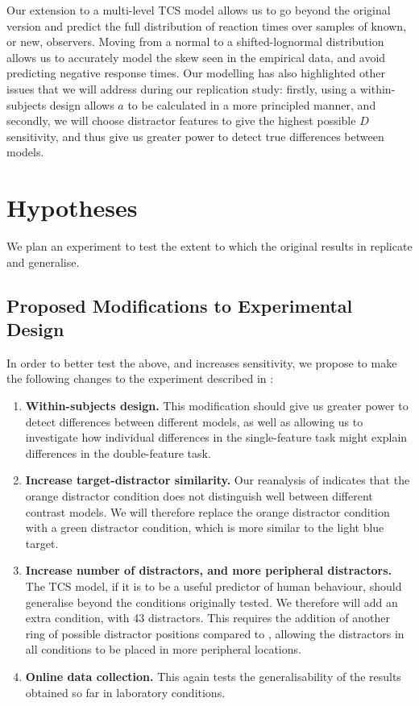 \documentclass[preprint,12pt,authoryear]{elsarticle}
\begin{document}
Our extension to a multi-level TCS model allows us to go beyond the original version and predict the full distribution of reaction times over samples of known, or new, observers. Moving from a normal to a shifted-lognormal distribution allows us to accurately model the skew seen in the empirical data, and avoid predicting negative response times. Our modelling has also highlighted other issues that we will address during our replication study: firstly, using a within-subjects design allows $a$ to be calculated in a more principled manner, and secondly, we will choose distractor features to give the highest possible $D$ sensitivity, and thus give us greater power to detect true differences between models.

\section{Hypotheses}

We plan an experiment to test the extent to which the original results in \cite{buetti2019predicting} replicate and generalise.

\subsection{Proposed Modifications to Experimental Design}

In order to better test the above, and increases sensitivity, we propose to make the following changes to the experiment described in \cite{buetti2019predicting}:

\begin{enumerate}
\item \textbf{Within-subjects design.} This modification should give us greater power to detect differences between different models, as well as allowing us to investigate how individual differences in the single-feature task might explain differences in the double-feature task.
\\
\item \textbf{Increase target-distractor similarity.} Our reanalysis of \cite{buetti2019predicting} indicates that the orange distractor condition does not distinguish well between different contrast models. We will therefore replace the orange distractor condition with a green distractor condition, which is more similar to the light blue target.
\\
\item \textbf{Increase number of distractors, and more peripheral distractors.} The TCS model, if it is to be a useful predictor of human behaviour, should generalise beyond the conditions originally tested. We therefore will add an extra condition, with 43 distractors. This requires the addition of another ring of possible distractor positions compared to \cite{buetti2019predicting}, allowing the distractors in all conditions to be placed in more peripheral locations. 
\\
\item \textbf{Online data collection.} This again tests the generalisability of the results obtained so far in laboratory conditions.
\end{enumerate}
\end{document}
